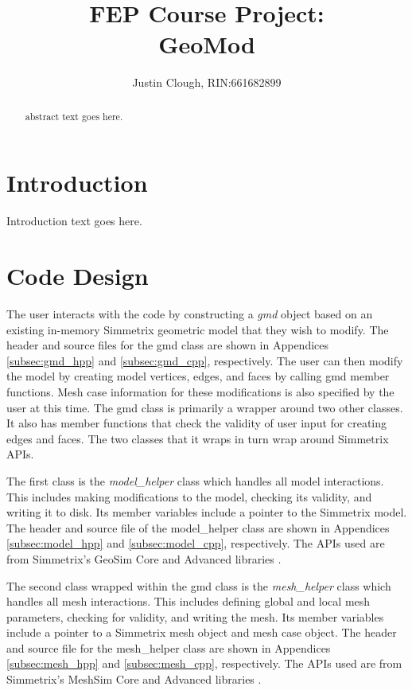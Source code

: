 \documentclass[a4paper, 12pt]{article}
\author{Justin Clough, RIN:661682899}
\title{FEP Course Project: \\
        GeoMod}
\begin{document}
\maketitle

\begin{abstract}
abstract text goes here.

\end{abstract}

\section{Introduction} \label{sec:intro}
Introduction text goes here.

\section{Code Design} \label{sec:design}
The user interacts with the code by constructing a \emph{gmd}
object based on an existing in-memory Simmetrix geometric model that they 
wish to modify. The header and source files for the gmd class 
are shown in Appendices \ref{subsec:gmd_hpp} and \ref{subsec:gmd_cpp}, 
respectively.  The user can then modify the model by 
creating model vertices, edges, and faces by calling
gmd member functions. Mesh case information for these 
modifications is also specified by the user at this time.
The gmd class is primarily a wrapper around two other classes. It also
has member functions that check the validity of user input for creating 
edges and faces. The two classes that it wraps in turn wrap around Simmetrix APIs.

The first class is the \emph{model\_helper} class 
which handles all model interactions. This includes making modifications to
the model, checking its validity, and writing it to disk. Its member variables
include a pointer to the Simmetrix model. The header and source file of the 
model\_helper class are shown in Appendices \ref{subsec:model_hpp} and 
\ref{subsec:model_cpp}, respectively. The APIs used are from Simmetrix's 
GeoSim Core and Advanced libraries \cite{Simmetrix}. 

The second class wrapped within the gmd class is the
\emph{mesh\_helper} class which handles all mesh interactions. This includes
defining global and local mesh parameters, checking for validity, and writing the
mesh. Its member variables include a pointer to a Simmetrix mesh object and mesh case object. 
The header and source file for the mesh\_helper class are shown in 
Appendices \ref{subsec:mesh_hpp} and \ref{subsec:mesh_cpp}, respectively.
The APIs used are from Simmetrix's MeshSim Core and Advanced libraries 
\cite{Simmetrix}.
\end{document}
